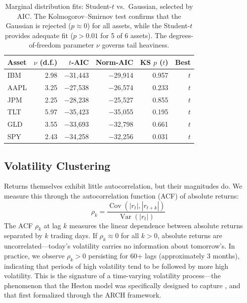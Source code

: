 \documentclass[11pt,a4paper]{article}
\newcommand{\Var}{\operatorname{Var}}
\newcommand{\Cov}{\operatorname{Cov}}
\begin{document}
\begin{table}[H]
\centering
\caption{Marginal distribution fits: Student-$t$ vs.\ Gaussian, selected by AIC. The Kolmogorov--Smirnov test confirms that the Gaussian is rejected ($p \approx 0$) for all assets, while the Student-$t$ provides adequate fit ($p > 0.01$ for 5 of 6 assets). The degrees-of-freedom parameter $\nu$ governs tail heaviness.}
\label{tab:marginals}
\small
\begin{tabular}{@{}lrrrrr@{}}
\toprule
\textbf{Asset} & \textbf{$\nu$ (d.f.)} & \textbf{$t$-AIC} & \textbf{Norm-AIC} & \textbf{KS $p$ ($t$)} & \textbf{Best} \\
\midrule
IBM  & 2.98 & $-$31{,}443 & $-$29{,}914 & 0.957 & $t$ \\
AAPL & 3.25 & $-$27{,}538 & $-$26{,}574 & 0.233 & $t$ \\
JPM  & 2.25 & $-$28{,}238 & $-$25{,}527 & 0.855 & $t$ \\
TLT  & 5.97 & $-$35{,}423 & $-$35{,}055 & 0.195 & $t$ \\
GLD  & 3.55 & $-$33{,}693 & $-$32{,}798 & 0.661 & $t$ \\
SPY  & 2.43 & $-$34{,}258 & $-$32{,}256 & 0.031 & $t$ \\
\bottomrule
\end{tabular}
\end{table}

\subsection{Volatility Clustering}
\label{sec:volclustering}

Returns themselves exhibit little autocorrelation, but their magnitudes do.
We measure this through the autocorrelation function (ACF) of absolute returns:
\begin{equation}
\label{eq:acf}
\rho_k = \frac{\Cov(|r_t|, |r_{t+k}|)}{\Var(|r_t|)}
\end{equation}
The ACF $\rho_k$ at lag $k$ measures the linear dependence between absolute returns separated by $k$ trading days.
If $\rho_k \approx 0$ for all $k > 0$, absolute returns are uncorrelated---today's volatility carries no information about tomorrow's.
In practice, we observe $\rho_k > 0$ persisting for 60+ lags (approximately 3 months), indicating that periods of high volatility tend to be followed by more high volatility.
This is the signature of a time-varying volatility process---the phenomenon that the Heston model was specifically designed to capture \citep{heston1993}, and that \citet{engle1982} first formalized through the ARCH framework.
\end{document}
